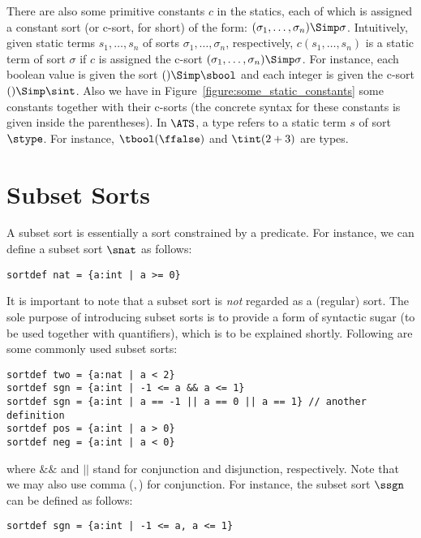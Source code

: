 There are also some primitive constants $c$ in the statics, each of which
is assigned a constant sort (or c-sort, for short) of the form:
$(\sigma_1,\ldots,\sigma_n)\Simp\sigma$.  Intuitively, given static terms
$s_1,\ldots,s_n$ of sorts $\sigma_1,\ldots,\sigma_n$, respectively,
$c(s_1,\ldots,s_n)$ is a static term of sort $\sigma$ if $c$ is assigned
the c-sort $(\sigma_1,\ldots,\sigma_n)\Simp\sigma$. For instance, each
boolean value is given the sort $()\Simp\sbool$ and each integer is given
the c-sort $()\Simp\sint$. Also we have in
Figure~\ref{figure:some_static_constants} some constants together with
their c-sorts (the concrete syntax for these constants is given inside the
parentheses).  In $\ATS$, a type refers to a static term $s$ of sort
$\stype$. For instance, $\tbool(\ffalse)$ and $\tint(2+3)$ are types.

\section{Subset Sorts}
A subset sort is essentially a sort constrained by a predicate. For
instance, we can define a subset sort $\snat$ as follows:
\begin{verbatim}
sortdef nat = {a:int | a >= 0}
\end{verbatim}
It is important to note that a subset sort is {\em not} regarded as a
(regular) sort. The sole purpose of introducing subset sorts is to provide
a form of syntactic sugar (to be used together with quantifiers), which is
to be explained shortly.  Following are some commonly used subset sorts:
\begin{verbatim}
sortdef two = {a:nat | a < 2}
sortdef sgn = {a:int | -1 <= a && a <= 1}
sortdef sgn = {a:int | a == -1 || a == 0 || a == 1} // another definition
sortdef pos = {a:int | a > 0}
sortdef neg = {a:int | a < 0}
\end{verbatim}
where $\&\&$ and $||$ stand for conjunction and disjunction, respectively.
Note that we may also use comma ($,$) for conjunction. For instance,
the subset sort $\ssgn$ can be defined as follows:
\begin{verbatim}
sortdef sgn = {a:int | -1 <= a, a <= 1}
\end{verbatim}

